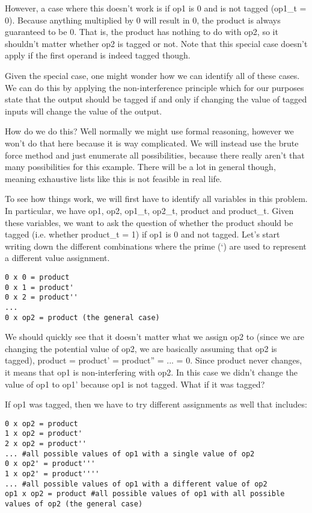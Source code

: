However, a case where this doesn’t work is if op1 is 0 and is not tagged (op1\_t = 0). Because anything
multiplied by 0 will result in 0, the product is always guaranteed to be 0. That is, the product has nothing
to do with op2, so it shouldn’t matter whether op2 is tagged or not. Note that this special case doesn’t
apply if the first operand is indeed tagged though.

Given the special case, one might wonder how we can identify all of these cases. We can do this by
applying the non-interference principle which for our purposes state that the output should be tagged if
and only if changing the value of tagged inputs will change the value of the output.

How do we do this? Well normally we might use formal reasoning, however we won’t do that here
because it is way complicated. We will instead use the brute force method and just enumerate all
possibilities, because there really aren’t that many possibilities for this example. There will be a lot in
general though, meaning exhaustive lists like this is not feasible in real life.

To see how things work, we will first have to identify all variables in this problem. In particular, we have
op1, op2, op1\_t, op2\_t, product and product\_t. Given these variables, we want to ask the question of
whether the product should be tagged (i.e. whether product\_t = 1) if op1 is 0 and not tagged. Let’s start
writing down the different combinations where the prime (‘) are used to represent a different value
assignment.

\begin{verbatim}
0 x 0 = product
0 x 1 = product'
0 x 2 = product''
...
0 x op2 = product (the general case)
\end{verbatim}

We should quickly see that it doesn’t matter what we assign op2 to (since we are changing the potential
value of op2, we are basically assuming that op2 is tagged), product = product' = product'' = ... = 0. Since
product never changes, it means that op1 is non-interfering with op2. In this case we didn’t change the
value of op1 to op1’ because op1 is not tagged. What if it was tagged?

If op1 was tagged, then we have to try different assignments as well that includes:

\begin{verbatim}
0 x op2 = product
1 x op2 = product'
2 x op2 = product''
... #all possible values of op1 with a single value of op2
0 x op2' = product'''
1 x op2' = product''''
... #all possible values of op1 with a different value of op2
op1 x op2 = product #all possible values of op1 with all possible values of op2 (the general case)
\end{verbatim}

